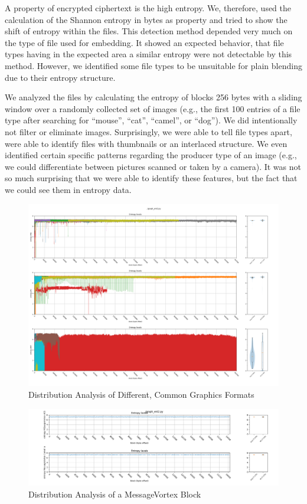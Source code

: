 A property of encrypted ciphertext is the high entropy. We, therefore, used the calculation of the Shannon entropy in bytes as property and tried to show the shift of entropy within the files. This detection method depended very much on the type of file used for embedding. It showed an expected behavior, that file types having in the expected area a similar entropy were not detectable by this method. However, we identified some file types to be unsuitable for plain blending due to their entropy structure.

We analyzed the files by calculating the entropy of blocks 256 bytes with a sliding window over a randomly collected set of images (e.g., the first 100 entries of a file type after searching for ``mouse'', ``cat'', ``camel'', or ``dog''). We did intentionally not filter or eliminate images. Surprisingly, we were able to tell file types apart, were able to identify files with thumbnails or an interlaced structure. We even identified certain specific patterns regarding the producer type of an image (e.g., we could differentiate between pictures scanned or taken by a camera). It was not so much surprising that we were able to identify these features, but the fact that we could see them in entropy data.

\begin{figure}[ht]
	\includegraphics[width=\textwidth]{inc/statanalysis_graph}
	\caption{Distribution Analysis of Different, Common Graphics Formats}
	\label{fig:statGraph}
\end{figure}

\begin{figure}[ht]
	\includegraphics[width=\textwidth]{inc/statanalysis_mv}
	\caption{Distribution Analysis of a MessageVortex Block}
	\label{fig:statMvGraph}
\end{figure}

